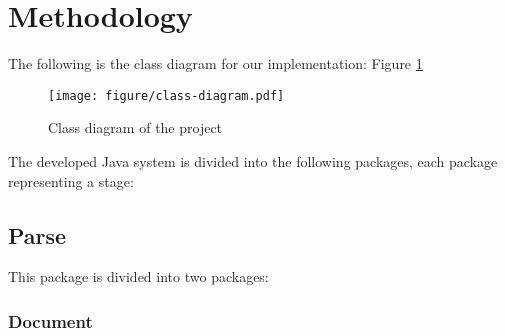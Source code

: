 \section{Methodology}
\label{sec:methodology}


The following is the class diagram for our implementation: Figure \ref{fig:class-diagram}

\begin{figure}[h]
	\centering
	\texttt{[image: figure/class-diagram.pdf]}
	\caption{Class diagram of the project}
	\label{fig:class-diagram}
\end{figure}

The developed Java system is divided into the following packages, each package representing a stage:


\subsection{Parse}
\label{subsec:parse}
  
  This package is divided into two packages: 
\subsubsection{Document}
        
